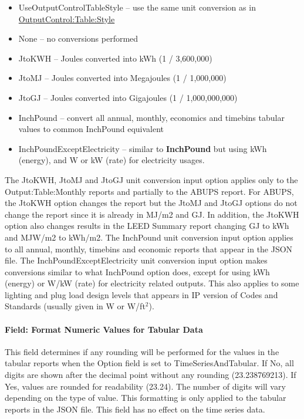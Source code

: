 \begin{itemize}
\item
UseOutputControlTableStyle -- use the same unit conversion as in   \hyperref[outputcontroltablestyle]{OutputControl:Table:Style}

\item
None -- no conversions performed
\item
JtoKWH -- Joules converted into kWh (1 / 3,600,000)
\item
JtoMJ -- Joules converted into Megajoules (1 / 1,000,000)
\item
JtoGJ -- Joules converted into Gigajoules (1 / 1,000,000,000)
\item
InchPound -- convert all annual, monthly, economics and timebins tabular values to common InchPound equivalent
\item
InchPoundExceptElectricity -- similar to \textbf{InchPound} but using kWh (energy), and W or kW (rate) for electricity usages.
\end{itemize}

The JtoKWH, JtoMJ and JtoGJ unit conversion input option applies only to the Output:Table:Monthly reports and partially to the ABUPS report. For ABUPS, the JtoKWH option changes the report but the JtoMJ and JtoGJ options do not change the report since it is already in MJ/m2 and GJ. In addition, the JtoKWH option also changes results in the LEED Summary report changing GJ to kWh and MJW/m2 to kWh/m2. The InchPound unit conversion input option applies to all annual, monthly, timebins and economic reports that appear in the JSON file. The InchPoundExceptElectricity unit conversion input option makes conversions similar to what InchPound option does, except for using kWh (energy) or W/kW (rate) for electricity related outputs. This also applies to some lighting and plug load design levels that appears in IP version of Codes and Standards (usually given in W or W/ft$^2$).

\paragraph{Field: Format Numeric Values for Tabular Data}\label{field-format-numeric-values-for-tabular-data-json}

This field determines if any rounding will be performed for the values in the tabular reports when the Option field is set to TimeSeriesAndTabular. If No, all digits are shown after the decimal point without any rounding (23.238769213). If Yes, values are rounded for readability (23.24). The number of digits will vary depending on the type of value. This formatting is only applied to the tabular reports in the JSON file. This field has no effect on the time series data.

